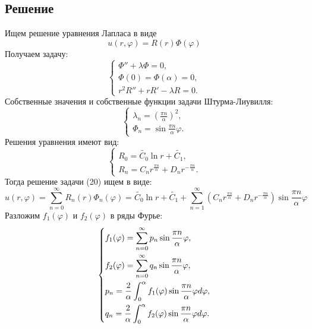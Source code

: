\documentclass[11pt]{article}
\begin{document}
\subsection{Решение}
\label{sec:org8559e45}
Ищем решение уравнения Лапласа в виде
\begin{equation*}
u(r, \varphi) = R(r)\Phi(\varphi)
\end{equation*}
Получаем задачу:
\begin{equation*}
\begin{cases}
\Phi'' + \lambda\Phi = 0, \\
\Phi(0) = \Phi(\alpha) = 0, \\
r^2R'' + rR' - \lambda R = 0.
\end{cases}
\end{equation*}
Собственные значения и собственные функции задачи Штурма-Лиувилля:
\begin{equation*}
\begin{cases}
\lambda_n = \left(\frac{\pi n}{\alpha}\right)^2, \\
\Phi_n = \sin\frac{\pi n}{\alpha}\varphi.
\end{cases}
\end{equation*}
Решения уравнения имеют вид:
\begin{equation*}
\begin{cases}
R_0 = \tilde{C_0}\ln r + \tilde{C_1}, \\
R_n = C_nr^{\frac{\pi n}\alpha} + D_nr^{-\frac{\pi n}\alpha}.
\end{cases}
\end{equation*}
Тогда решение задачи (20) ищем в виде:
\begin{equation}
u(r, \varphi) = \sum_{n = 0}^{\infty}R_n(r)\Phi_n(\varphi) = \tilde{C_0}\ln r + \tilde{C_1} +
\sum_{n = 1}^{\infty}(C_nr^{\frac{\pi n}\alpha} + D_nr^{-\frac{\pi n}\alpha})\sin\frac{\pi n}\alpha\varphi
\end{equation}
Разложим $f_1(\varphi)$ и $f_2(\varphi)$ в ряды Фурье:
\begin{equation*}
\begin{dcases}
f_1(\varphi) = \sum_{n = 0}^{\infty}p_n\sin\frac{\pi n}\alpha\varphi, \\
f_2(\varphi) = \sum_{n = 0}^{\infty}q_n\sin\frac{\pi n}\alpha\varphi, \\
p_n = \frac2\alpha\int_0^{\alpha}f_1(\varphi)\sin\frac{\pi n}\alpha\varphi d\varphi, \\
q_n = \frac2\alpha\int_0^{\alpha}f_2(\varphi)\sin\frac{\pi n}\alpha\varphi d\varphi.
\end{dcases}
\end{equation*}
\end{document}
